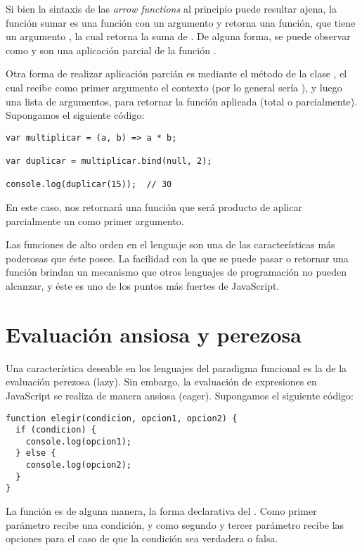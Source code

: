 Si bien la sintaxis de las \textit{arrow functions} al principio puede resultar ajena, la función sumar es una función con un argumento  y retorna una función, que tiene un argumento , la cual retorna la suma de . De alguna forma, se puede observar como  y  son una aplicación parcial de la función .

Otra forma de realizar aplicación parcián es mediante el método  de la clase , el cual recibe como primer argumento el contexto (por lo general sería ), y luego una lista de argumentos, para retornar la función aplicada (total o parcialmente). Supongamos el siguiente código:

\begin{lstlisting}[title={Aplicación parcial usando \code{bind}}]
var multiplicar = (a, b) => a * b;

var duplicar = multiplicar.bind(null, 2);

console.log(duplicar(15));	// 30
\end{lstlisting}

En este caso,  nos retornará una función que será producto de aplicar parcialmente un  como primer argumento. 

Las funciones de alto orden en el lenguaje son una de las características más poderosas que éste posee. La facilidad con la que se puede pasar o retornar una función brindan un mecanismo que otros lenguajes de programación no pueden alcanzar, y éste es uno de los puntos más fuertes de JavaScript.

\section{Evaluación ansiosa y perezosa}

Una característica deseable en los lenguajes del paradigma funcional es la de la evaluación perezosa (lazy). Sin embargo, la evaluación de expresiones en JavaScript se realiza de manera ansiosa (eager). Supongamos el siguiente código:

\begin{lstlisting}[title={Creando una función condicional}]
function elegir(condicion, opcion1, opcion2) {
  if (condicion) {
    console.log(opcion1);
  } else {
    console.log(opcion2);
  }
}
\end{lstlisting}

La función  es de alguna manera, la forma declarativa del . Como primer parámetro recibe una condición, y como segundo y tercer parámetro recibe las opciones para el caso de que la condición sea verdadera o falsa.

